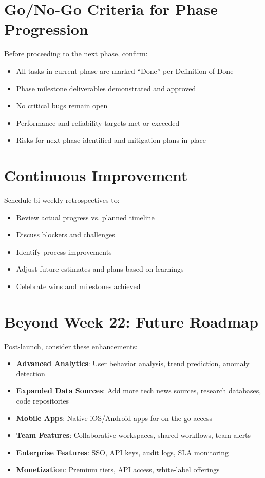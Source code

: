 \documentclass[12pt,oneside]{report}
\begin{document}
\section{Go/No-Go Criteria for Phase Progression}

Before proceeding to the next phase, confirm:

\begin{itemize}
    \item All tasks in current phase are marked ``Done'' per Definition of Done
    \item Phase milestone deliverables demonstrated and approved
    \item No critical bugs remain open
    \item Performance and reliability targets met or exceeded
    \item Risks for next phase identified and mitigation plans in place
\end{itemize}

\section{Continuous Improvement}

Schedule bi-weekly retrospectives to:

\begin{itemize}
    \item Review actual progress vs. planned timeline
    \item Discuss blockers and challenges
    \item Identify process improvements
    \item Adjust future estimates and plans based on learnings
    \item Celebrate wins and milestones achieved
\end{itemize}

\section{Beyond Week 22: Future Roadmap}

Post-launch, consider these enhancements:

\begin{itemize}
    \item \textbf{Advanced Analytics}: User behavior analysis, trend prediction, anomaly detection
    \item \textbf{Expanded Data Sources}: Add more tech news sources, research databases, code repositories
    \item \textbf{Mobile Apps}: Native iOS/Android apps for on-the-go access
    \item \textbf{Team Features}: Collaborative workspaces, shared workflows, team alerts
    \item \textbf{Enterprise Features}: SSO, API keys, audit logs, SLA monitoring
    \item \textbf{Monetization}: Premium tiers, API access, white-label offerings
\end{itemize}
\end{document}
